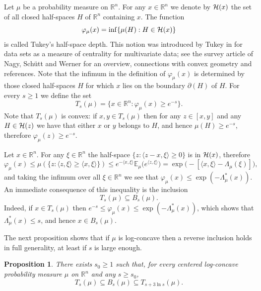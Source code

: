 \documentclass[11pt,leqno]{article}
\newtheorem{proposition}[theorem]{Proposition}
\theoremstyle{definition}
\theoremstyle{remark}
\numberwithin{equation}{section}
\newcommand{\ls}{\leqslant}
\newcommand{\gr}{\geqslant}
\newcommand{\1}{\textbf{1}}
\begin{document}
Let $\mu $ be a probability measure on ${\mathbb R}^n$. For any $x\in {\mathbb R}^n$ we denote by ${\cal H}(x)$ the set
of all closed half-spaces $H$ of ${\mathbb R}^n$ containing $x$. The function
$$\varphi_{\mu }(x)=\inf\{\mu (H):H\in {\cal H}(x)\}$$
is called Tukey's half-space depth. This notion was introduced by Tukey in \cite{Tukey-1975} for data sets as a
measure of centrality for multivariate data; see the survey article of Nagy, Sch\"{u}tt and Werner
\cite{Nagy-Schutt-Werner-2019} for an overview, connections
with convex geometry and references. Note that the infimum in the definition of $\varphi_{\mu}(x)$
is determined by those closed half-spaces $H$ for which $x$ lies on the boundary $\partial (H)$ of $H$.
For every $s\gr 1$ we define the set
$$T_s(\mu)=\{x\in \mathbb{R}^n:\varphi_{\mu}(x)\gr e^{-s}\}.$$
Note that $T_s(\mu)$ is convex: if $x,y\in T_s(\mu)$ then for any $z\in [x,y]$ and any $H\in {\cal H}(z)$ we
have that either $x$ or $y$ belongs to $H$, and hence $\mu(H)\gr e^{-s}$, therefore $\varphi_{\mu}(z)\gr e^{-s}$.

Let $x\in {\mathbb R}^n$. For any $\xi \in {\mathbb R}^n$ the half-space
$\{z:\langle z-x,\xi  \rangle \gr 0\}$ is in ${\cal H}(x)$, therefore
\begin{equation*}
\varphi_{\mu } (x) \ls \mu (\{z:\langle z,\xi  \rangle \gr \langle x,\xi \rangle\} )
\ls e^{-\langle x,\xi \rangle }{\mathbb E}_{\mu }\big(e^{\langle z,\xi \rangle }\big)=\exp \big(-[\langle x,\xi \rangle -\Lambda_{\mu }(\xi )]\big),\end{equation*}
and taking the infimum over all $\xi \in {\mathbb R}^n$ we see that
$\varphi_{\mu } (x)\ls\exp (-\Lambda_{\mu }^{\ast }(x))$. An immediate consequence of this inequality is the inclusion
\begin{equation}\label{eq:floating-1}T_s(\mu)\subseteq B_s(\mu).\end{equation}
Indeed, if $x\in T_s(\mu)$ then $e^{-s}\ls\varphi_{\mu}(x)\ls\exp (-\Lambda_{\mu }^{\ast }(x))$, which shows that
$\Lambda_{\mu}^{\ast}(x)\ls s$, and hence $x\in B_s(\mu)$.

The next proposition shows that if $\mu$ is log-concave then a reverse inclusion holds in full generality,
at least if $s$ is large enough.

\begin{proposition}\label{prop:floating-1}There exists $s_0\gr 1$ such that, for every centered log-concave
probability measure $\mu$ on $\mathbb{R}^n$ and any $s\gr s_0$,
$$T_s(\mu)\subseteq B_s(\mu)\subseteq T_{s+3\ln s}(\mu).$$
\end{proposition}
\end{document}
